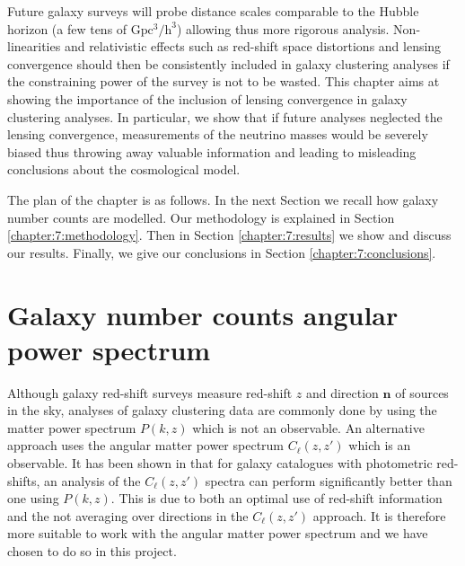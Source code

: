 Future galaxy surveys will probe distance scales comparable to the Hubble horizon (a few tens of $\mathrm{Gpc^3/h^3}$) allowing thus more rigorous analysis. Non-linearities and relativistic effects such as red-shift space distortions and lensing convergence should then be consistently included in galaxy clustering analyses if the constraining power of the survey is not to be wasted. This chapter aims at showing the importance of the inclusion of lensing convergence in galaxy clustering analyses. In particular, we show that if future analyses neglected the lensing convergence, measurements of the neutrino masses would be severely biased thus throwing away valuable information and leading to misleading conclusions about the cosmological model. 

The plan of the chapter is as follows. In the next Section we recall how galaxy number counts are modelled. Our methodology is explained in Section \ref{chapter:7:methodology}. Then in Section \ref{chapter:7:results} we show and discuss our results. Finally, we give our conclusions in Section \ref{chapter:7:conclusions}.

\section{Galaxy number counts angular power spectrum}
\label{chapter:7:modelling}

Although galaxy red-shift surveys measure red-shift $z$ and direction $\mathbf{n}$ of sources in the sky, analyses of galaxy clustering data are commonly done by using the matter power spectrum $P(k,z)$  which is not an observable. An alternative approach uses the angular matter power spectrum $C_\ell(z,z')$ which is an observable. It has been shown in  that for galaxy catalogues with photometric red-shifts, an analysis of the $C_\ell(z,z')$ spectra can perform significantly better than one using $P(k,z)$. This is due to both an optimal use of red-shift information and the not averaging over directions in the $C_\ell(z,z')$ approach. It is therefore more suitable to work with the angular matter power spectrum and we have chosen to do so in this project.  

